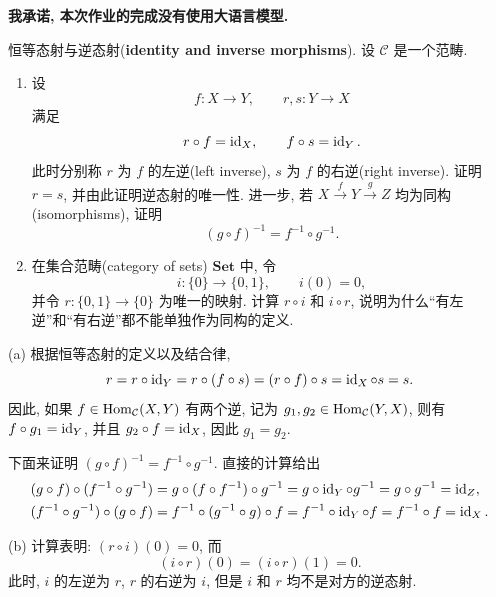 \documentclass{article}
\begin{document}
\textbf{我承诺, 本次作业的完成没有使用大语言模型. }

\begin{problem}
  {\heiti 恒等态射与逆态射}(\textbf{identity and inverse morphisms}). 设 $\mathcal C$ 是一个范畴.

  \begin{enumerate}
    \item[(a)] 设
      \[
        f:X\to Y,\qquad r,s:Y\to X
      \]
      满足
      \[
        r\circ f=\operatorname{id}_X,\qquad f\circ s=\operatorname{id}_Y.
      \]
      此时分别称 $r$ 为 $f$ 的左逆(left inverse), $s$ 为 $f$ 的右逆(right inverse). 证明 $r=s$, 并由此证明逆态射的唯一性. 进一步, 若 $X\xrightarrow{f}Y\xrightarrow{g}Z$ 均为同构(isomorphisms), 证明
      \[
        (g\circ f)^{-1}=f^{-1}\circ g^{-1}.
      \]

    \item[(b)] 在集合范畴(category of sets) $\mathbf{Set}$ 中, 令
      \[
        i:\{0\}\longrightarrow\{0,1\},\qquad i(0)=0,
      \]
      并令 $r:\{0,1\}\to\{0\}$ 为唯一的映射. 计算 $r\circ i$ 和 $i\circ r$, 说明为什么``有左逆''和``有右逆''都不能单独作为同构的定义.
  \end{enumerate}
\end{problem}

\begin{solution}
	(a) 根据恒等态射的定义以及结合律,
	\[ r = r \circ \operatorname{id}_Y = r \circ (f \circ s)
	= (r \circ f) \circ s = \operatorname{id}_X \circ s = s. \]
	因此, 如果 $f\in \operatorname{Hom}_{\mathcal{C}}(X,Y)$ 有两个逆, 记为 $g_1, g_2 \in \operatorname{Hom}_{\mathcal{C}}(Y,X)$, 则有 $f \circ g_1 = \operatorname{id}_Y$, 并且 $g_2 \circ f = \operatorname{id}_X$, 因此 $g_1=g_2$.

	下面来证明 $(g\circ f)^{-1} = f^{-1}\circ g^{-1}$. 直接的计算给出
	\begin{align*}
		(g\circ f) \circ (f^{-1}\circ g^{-1})
		&= g \circ (f\circ f^{-1}) \circ g^{-1} 
		= g\circ \operatorname{id}_Y \circ g^{-1}
		= g\circ g^{-1} = \operatorname{id}_Z,\\
		(f^{-1}\circ g^{-1}) \circ (g\circ f) 
		&= f^{-1} \circ (g^{-1} \circ g) \circ f
		= f^{-1} \circ \operatorname{id}_Y \circ f
		= f^{-1} \circ f = \operatorname{id}_X.
	\end{align*}

	(b) 计算表明: $(r \circ i) (0) = 0$, 而
	\[ (i \circ r) (0) = (i \circ r) (1) = 0. \]
	此时, $i$ 的左逆为 $r$, $r$ 的右逆为 $i$, 但是 $i$ 和 $r$ 均不是对方的逆态射.
\end{solution}
\end{document}
